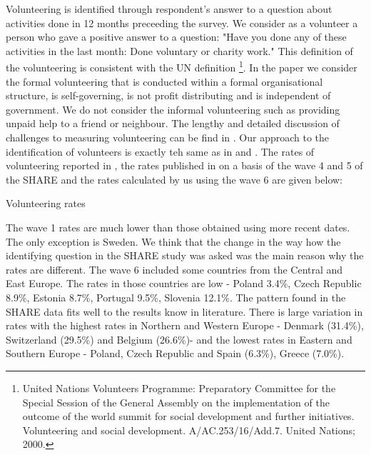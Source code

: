 \documentclass[10pt, letterpaper]{article}
\begin{document}
\begin{spacing}{1.4}
Volunteering is identified through respondent's answer to a question about activities done in 12 months preceeding the survey. We consider as a volunteer a person who gave a positive answer to a question: "Have you done any of these activities in the last month: Done voluntary or charity work."  This definition of the volunteering is consistent with the UN definition \footnote{United Nations Volunteers Programme: Preparatory Committee for the Special Session of the General Assembly on the implementation of the outcome of the world summit for social development and further initiatives. Volunteering and social development. A/AC.253/16/Add.7. United Nations; 2000.}. In the paper we consider the formal volunteering that is conducted within a formal organisational structure, is self-governing, is not profit distributing and is independent of government. We do not consider the informal volunteering such as providing unpaid help to a friend or neighbour. The lengthy and detailed discussion of challenges to measuring volunteering can be find in \citet{salomon2017}. Our approach to the identification of volunteers is exactly teh same as in \citet{haski09} and \citet{oecd2015}. The rates of volunteering reported in \citet{haski09}, the rates published in \citet{oecd2015} on a basis of the wave 4 and 5 of the SHARE and the rates calculated by us using the wave 6 are given below:  \\

\begin{spacing}{.9}
\begin{table}[H]
\centering 
\caption{Volunteering rates}  
\begin{scriptsize} 
	 
      \label{Rates} 
\end{scriptsize}
\end{table}
\end{spacing}


The wave 1 rates are much lower than those obtained using more recent dates. The only exception is Sweden. We think that the change in the way how the identifying question in the SHARE study was asked was the main reason why the rates are different. The wave 6 included some countries from the Central and East Europe. The rates in those countries are low - Poland 3.4\%, Czech Republic 8.9\%, Estonia 8.7\%, Portugal 9.5\%, Slovenia 12.1\%. The pattern found in the SHARE data fits well to the results know in literature. There is large variation in rates with the highest rates in Northern and Western Europe -  Denmark (31.4\%), Switzerland (29.5\%) and Belgium (26.6\%)-  and the lowest rates in Eastern and Southern Europe - Poland, Czech Republic and Spain (6.3\%), Greece (7.0\%).  \\


\end{spacing}
\end{document}
